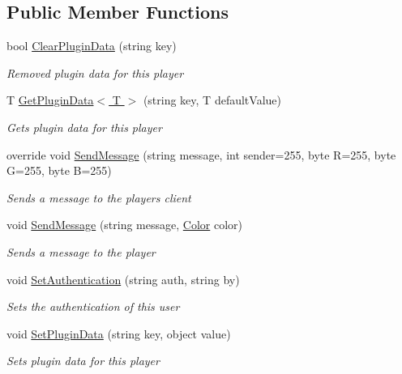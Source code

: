 \subsection*{Public Member Functions}
\begin{DoxyCompactItemize}
\item 
bool \hyperlink{classOTA_1_1BasePlayer_a1a60c20af7806e8be97190c1b035fba8}{Clear\+Plugin\+Data} (string key)
\begin{DoxyCompactList}\small\item\em Removed plugin data for this player \end{DoxyCompactList}\item 
T \hyperlink{classOTA_1_1BasePlayer_a7a8a4aede1a3721c557e962b7fcf71dd}{Get\+Plugin\+Data$<$ T $>$} (string key, T default\+Value)
\begin{DoxyCompactList}\small\item\em Gets plugin data for this player \end{DoxyCompactList}\item 
override void \hyperlink{classOTA_1_1BasePlayer_aab351e86d2672170773b0e58782ce64c}{Send\+Message} (string message, int sender=255, byte R=255, byte G=255, byte B=255)
\begin{DoxyCompactList}\small\item\em Sends a message to the players client \end{DoxyCompactList}\item 
void \hyperlink{classOTA_1_1BasePlayer_a8fe3889b8e8013c043f7bb0f31ccb652}{Send\+Message} (string message, \hyperlink{structMicrosoft_1_1Xna_1_1Framework_1_1Color}{Color} color)
\begin{DoxyCompactList}\small\item\em Sends a message to the player \end{DoxyCompactList}\item 
void \hyperlink{classOTA_1_1BasePlayer_a2611407de80854038643a84fac41f2c9}{Set\+Authentication} (string auth, string by)
\begin{DoxyCompactList}\small\item\em Sets the authentication of this user \end{DoxyCompactList}\item 
void \hyperlink{classOTA_1_1BasePlayer_a65a264256638a3e74fa8303360ebcef7}{Set\+Plugin\+Data} (string key, object value)
\begin{DoxyCompactList}\small\item\em Sets plugin data for this player \end{DoxyCompactList}\end{DoxyCompactItemize}
